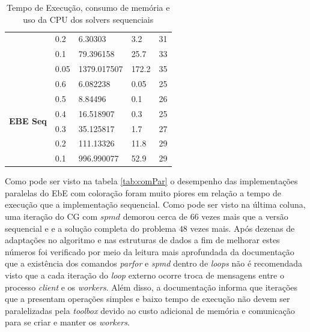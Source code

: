 \documentclass[
    12pt,               %
    openright,          %
    oneside,
    a4paper,            %
    english,            %
    french,             %
    spanish,            %
    brazil              %
    ]{abntex2}
\begin{document}
\begin{table}[]
\begin{tabular}{|l|l|l|l|l|}
		& 0.2           & 6.30303            & 3.2                 & 31             \\ \cline{2-5} 
		& 0.1           & 79.396158          & 25.7                & 33             \\ \cline{2-5} 
		& 0.05          & 1379.017507        & 172.2               & 35             \\ \hline
		\multirow{6}{*}{\textbf{EBE Seq}}       & 0.6           & 6.082238           & 0.05                & 25             \\ \cline{2-5} 
		& 0.5           & 8.84496            & 0.1                 & 26             \\ \cline{2-5} 
		& 0.4           & 16.518907          & 0.3                 & 25             \\ \cline{2-5} 
		& 0.3           & 35.125817          & 1.7                 & 27             \\ \cline{2-5} 
		& 0.2           & 111.13326          & 11.8                & 29             \\ \cline{2-5} 
		& 0.1           & 996.990077         & 52.9                & 29             \\ \hline
	\end{tabular}
	\caption{Tempo de Execução, consumo de memória e uso da CPU dos solvers sequenciais}	
	\label{tab:seq}	
\end{table}

Como pode ser visto na tabela \ref{tab:comPar} o desempenho das implementações paralelas do EbE com coloração foram muito piores em relação a tempo de execução que a implementação sequencial. Como pode ser visto na última coluna, uma iteração do CG com $spmd$ demorou cerca de $66$ vezes mais que a versão sequencial e e a solução completa  do problema $48$ vezes mais. Após dezenas de adaptações no algoritmo e nas estruturas de dados a fim de melhorar estes números foi verificado por meio da leitura mais aprofundada da documentação que a existência dos comandos \textit{parfor} e \textit{spmd} dentro de \textit{loops} não é recomendada visto que a cada iteração do \textit{loop} externo ocorre troca de mensagens entre o processo \textit{client} e os \textit{workers}. Além disso, a documentação informa que iterações que a presentam operações simples e baixo tempo de execução não devem ser paralelizadas pela  \textit{toolbox} devido ao custo adicional de memória e comunicação para se criar e manter os \textit{workers}.
\end{document}
